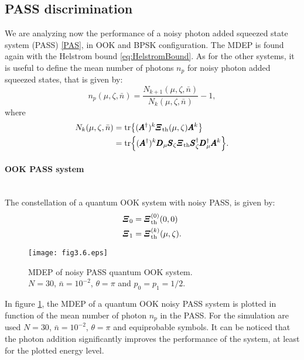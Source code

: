     \subsection{PASS discrimination}
        We are analyzing now the performance of a noisy photon added squeezed state system (PASS)
        \ref{PAS}, in OOK and BPSK configuration. The MDEP is found again with the Helstrom bound
        \ref{eq:HelstromBound}.
        As for the other systems, it is useful to define the mean number of photons $n_p$ for noisy 
        photon added squeezed states, that is given by:
        \begin{equation}
            n_p(\mu,\zeta,\bar{n}) = \frac{N_{k+1}(\mu,\zeta,\bar{n})}{N_k(\mu,\zeta,\bar{n})}-1,
            \label{eq:np_PASS}
        \end{equation}
        where
        \begin{equation}
            \begin{split}
                N_k(\mu,\zeta,\bar{n}) &= \tr{(\Operator{A}^\dagger)^k \Operator{\varXi}_{\mathrm{th}}(\mu,\zeta) \Operator{A}^k}\\
                                       &= \tr{(\Operator{A}^\dagger)^k \Operator{D}_\mu \Operator{S}_\zeta \Operator{\varXi}_{\mathrm{th}}
                                        \Operator{S}_\zeta^\dagger \Operator{D}_\mu^\dagger \Operator{A}^k}.
            \end{split}
        \end{equation}

        \paragraph{OOK PASS system}\mbox{}\\
        The constellation of a quantum OOK system with noisy PASS, is given by:
        \begin{equation}
            \begin{split}
                \Operator{\varXi}_0 &= \Operator{\varXi}_{\mathrm{th}}^{(0)}(0,0)\\
                \Operator{\varXi}_1 &= \Operator{\varXi}_{\mathrm{th}}^{(k)}(\mu,\zeta).
            \end{split}
        \end{equation}
        \begin{figure}[t]
            \begin{center}
                \texttt{[image: fig3.6.eps]}
                \caption{MDEP of noisy PASS quantum OOK system.\\
                $N=30$, $\bar{n}=10^{-2}$, $\theta=\pi$ and $p_0=p_1=1/2$.}
                \label{fig:3.6}
            \end{center}
        \end{figure}
        In figure \ref{fig:3.6}, the MDEP of a quantum OOK noisy PASS system is plotted in function
        of the mean number of photon $n_p$ in the PASS. For the simulation are used $N=30$, $\bar{n}=10^{-2}$, $\theta=\pi$ and
        equiprobable symbols.
        It can be noticed that the photon addition significantly improves the performance of the system,
        at least for the plotted energy level.

